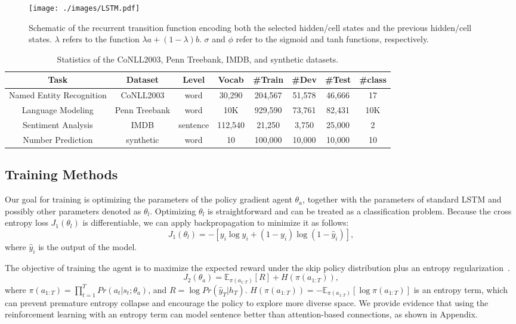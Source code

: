 \documentclass[letterpaper]{article} \usepackage{aaai19}  \usepackage{times}  \usepackage{helvet}  \usepackage{courier}  \usepackage{url}  \usepackage{graphicx}  \usepackage{amsmath}
\begin{document}
\begin{figure}[t]
\centering
  \texttt{[image: ./images/LSTM.pdf]}
  \caption{Schematic of the recurrent transition function encoding both the selected hidden/cell states and the previous hidden/cell states. $\lambda$ refers to the function $\lambda a + (1-\lambda)b$. $\sigma$ and $\phi$ refer to the sigmoid and tanh functions, respectively.} \label{fig:LSTM}
\end{figure}

\begin{table*}[t]
\centering
\begin{tabular}{cccccccc}
\hline
  Task & Dataset & Level & Vocab  & \textbf{\#}Train & \textbf{\#}Dev & \textbf{\#}Test & \textbf{\#}class \\
  \hline
  Named Entity Recognition & CoNLL2003 & word & 30,290 & 204,567 & 51,578 & 46,666 & 17 \\
  Language Modeling & Penn Treebank & word & 10K & 929,590 & 73,761 & 82,431 & 10K \\
  Sentiment Analysis & IMDB & sentence & 112,540 & 21,250 & 3,750 & 25,000 & 2 \\
  Number Prediction & synthetic & word & 10 & 100,000 & 10,000 & 10,000 & 10 \\
  \hline 
\end{tabular}
\caption{Statistics of the CoNLL2003, Penn Treebank, IMDB, and synthetic datasets.}
  \label{tab:statistics}
\end{table*}

\subsection{Training Methods}
Our goal for training is optimizing the parameters of the policy gradient agent $\theta_a$, together with the parameters of standard LSTM and possibly other parameters denoted as $\theta_l$. Optimizing $\theta_l$ is straightforward and can be treated as a classification problem. Because the cross entropy loss $J_1(\theta_l)$ is differentiable, we can apply backpropagation to minimize it as follows:
\begin{equation}
J_1(\theta_l) = -[y_i\log{\hat{y}_i}+(1-y_i)\log(1-\hat{y}_i)],
\end{equation}
where $\hat{y}_i$ is the output of the model.

The objective of training the agent is to maximize the expected reward under the skip policy distribution plus an entropy regularization~\cite{nachum2017bridging}.
\begin{equation}
J_2(\theta_a) = \mathbb{E}_{\pi(a_{1:T})}[R] + H(\pi(a_{1:T})),
\end{equation}
where $\pi(a_{1:T}) = \prod_{t=1}^T Pr(a_t|s_t;\theta_a)$, and $R = \log Pr(\hat{y}_T|h_T)$. $H(\pi(a_{1:T})) =-\mathbb{E}_{\pi(a_{1:T})}[\log \pi(a_{1:T})]$ is an entropy term, which can prevent premature entropy collapse and encourage the policy to explore more diverse space. We provide evidence that using the reinforcement learning with an entropy term can model sentence better than attention-based connections, as shown in Appendix.
\end{document}
